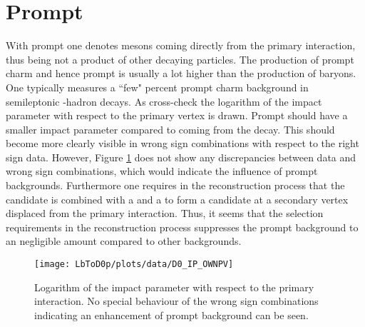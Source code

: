 \section{Prompt \Dz}
With prompt \Dz one denotes \Dz mesons coming directly from the primary \proton\proton interaction, thus being not a product of other decaying particles.
The production of prompt charm and hence prompt \Dz is usually a lot higher than the production of \Lb baryons. 
One typically measures a ``few" percent prompt charm background in semileptonic \bquark-hadron decays.
As cross-check the logarithm of the \Dz impact parameter with respect to the primary vertex is drawn.
Prompt \Dz should have a smaller impact parameter compared to \Dz coming from the \Lb decay.
This should become more clearly visible in wrong sign combinations with respect to the right sign data.
However, Figure \ref{fig:plot_D0_IP} does not show any discrepancies between data and wrong sign combinations, which would indicate the influence of prompt \Dz backgrounds.
Furthermore one requires in the reconstruction process that the \Dz candidate is combined with a \mun and a \proton to form a \Lb candidate at a secondary vertex displaced from the primary interaction.
Thus, it seems that the selection requirements in the reconstruction process suppresses the prompt \Dz background to an negligible amount compared to other backgrounds. 
\begin{figure}[ptb]
	\centering
	\texttt{[image: LbToD0p/plots/data/D0\_IP\_OWNPV]}
	\caption{Logarithm of the \Dz impact parameter with respect to the primary \proton\proton interaction. No special behaviour of the wrong sign combinations indicating an enhancement of prompt \Dz background can be seen.}
	\label{fig:plot_D0_IP}
\end{figure}

